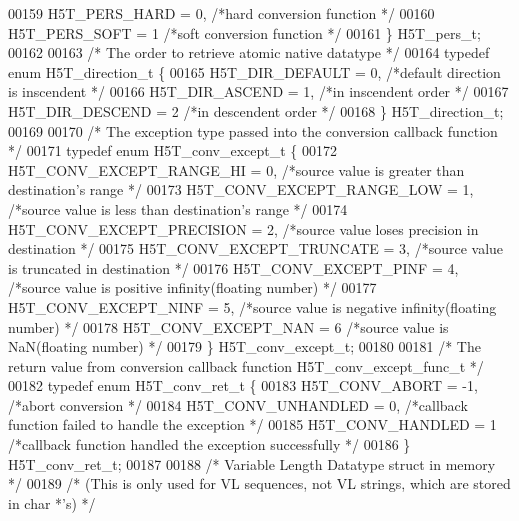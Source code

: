 \begin{DoxyCode}
00159     H5T\_PERS\_HARD   = 0,    \textcolor{comment}{/*hard conversion function           */}
00160     H5T\_PERS\_SOFT   = 1     \textcolor{comment}{/*soft conversion function           */}
00161 \} H5T\_pers\_t;
00162 
00163 \textcolor{comment}{/* The order to retrieve atomic native datatype */}
00164 \textcolor{keyword}{typedef} \textcolor{keyword}{enum} H5T\_direction\_t \{
00165     H5T\_DIR\_DEFAULT     = 0,    \textcolor{comment}{/*default direction is inscendent            */}
00166     H5T\_DIR\_ASCEND      = 1,    \textcolor{comment}{/*in inscendent order                        */}
00167     H5T\_DIR\_DESCEND     = 2     \textcolor{comment}{/*in descendent order                        */}
00168 \} H5T\_direction\_t;
00169 
00170 \textcolor{comment}{/* The exception type passed into the conversion callback function */}
00171 \textcolor{keyword}{typedef} \textcolor{keyword}{enum} H5T\_conv\_except\_t \{
00172     H5T\_CONV\_EXCEPT\_RANGE\_HI       = 0,   \textcolor{comment}{/*source value is greater than destination's range */}
00173     H5T\_CONV\_EXCEPT\_RANGE\_LOW      = 1,   \textcolor{comment}{/*source value is less than destination's range    */}
00174     H5T\_CONV\_EXCEPT\_PRECISION      = 2,   \textcolor{comment}{/*source value loses precision in destination      */}
00175     H5T\_CONV\_EXCEPT\_TRUNCATE       = 3,   \textcolor{comment}{/*source value is truncated in destination         */}
00176     H5T\_CONV\_EXCEPT\_PINF           = 4,   \textcolor{comment}{/*source value is positive infinity(floating number) */}
00177     H5T\_CONV\_EXCEPT\_NINF           = 5,   \textcolor{comment}{/*source value is negative infinity(floating number) */}
00178     H5T\_CONV\_EXCEPT\_NAN            = 6    \textcolor{comment}{/*source value is NaN(floating number)             */}
00179 \} H5T\_conv\_except\_t;
00180 
00181 \textcolor{comment}{/* The return value from conversion callback function H5T\_conv\_except\_func\_t */}
00182 \textcolor{keyword}{typedef} \textcolor{keyword}{enum} H5T\_conv\_ret\_t \{
00183     H5T\_CONV\_ABORT      = -1,   \textcolor{comment}{/*abort conversion                           */}
00184     H5T\_CONV\_UNHANDLED  = 0,    \textcolor{comment}{/*callback function failed to handle the exception      */}
00185     H5T\_CONV\_HANDLED    = 1     \textcolor{comment}{/*callback function handled the exception successfully  */}
00186 \} H5T\_conv\_ret\_t;
00187 
00188 \textcolor{comment}{/* Variable Length Datatype struct in memory */}
00189 \textcolor{comment}{/* (This is only used for VL sequences, not VL strings, which are stored in char *'s) */}

\end{DoxyCode}
